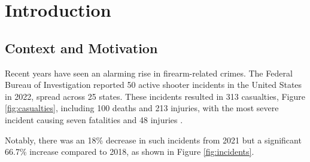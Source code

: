 \chapter{Introduction}
\label{chapter:introduction}

\newenvironment{introduction2}
{\quote\itshape}
{\endquote}

\begin{introduction2}
\end{introduction2}

\section{Context and Motivation}
Recent years have seen an alarming rise in firearm-related crimes. The Federal Bureau of Investigation reported 50 active shooter incidents in the United States in 2022, spread across 25 states. These incidents resulted in 313 casualties, Figure \ref{fig:casualties}, including 100 deaths and 213 injuries, with the most severe incident causing seven fatalities and 48 injuries \cite{rfc37}.

Notably, there was an 18\% decrease in such incidents from 2021 but a significant 66.7\% increase compared to 2018, as shown in Figure \ref{fig:incidents}.

